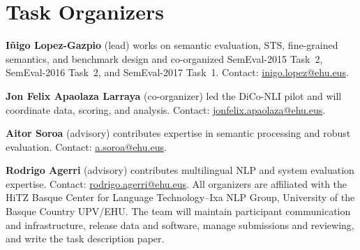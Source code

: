 \documentclass[11pt]{article}
\begin{document}
\section{Task Organizers}

\noindent\textbf{Iñigo Lopez-Gazpio} (lead) works on semantic evaluation, STS, fine-grained semantics, and benchmark design and co-organized SemEval-2015 Task~2, SemEval-2016 Task~2, and SemEval-2017 Task~1. Contact: \url{inigo.lopez@ehu.eus}.\par
\noindent\textbf{Jon Felix Apaolaza Larraya} (co-organizer) led the DiCo-NLI pilot and will coordinate data, scoring, and analysis. Contact: \url{jonfelix.apaolaza@ehu.eus}.\par
\noindent\textbf{Aitor Soroa} (advisory) contributes expertise in semantic processing and robust evaluation. Contact: \url{a.soroa@ehu.eus}.\par
\noindent\textbf{Rodrigo Agerri} (advisory) contributes multilingual NLP and system evaluation expertise. Contact: \url{rodrigo.agerri@ehu.eus}.
All organizers are affiliated with the HiTZ Basque Center for Language Technology--Ixa NLP Group, University of the Basque Country UPV/EHU.\@
The team will maintain participant communication and infrastructure, release data and software, manage submissions and reviewing, and write the task description paper.


\end{document}
